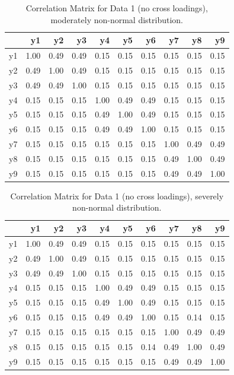 \documentclass[
  letterpaper,
  DIV=11,
  numbers=noendperiod]{scrartcl}
\begin{document}
\begin{longtable}[]{@{}lrrrrrrrrr@{}}

\caption{\label{tbl-cors_data_2}Correlation Matrix for Data 1 (no cross
loadings), moderately non-normal distribution.}

\tabularnewline

\toprule\noalign{}
& y1 & y2 & y3 & y4 & y5 & y6 & y7 & y8 & y9 \\
\midrule\noalign{}
\endhead
\bottomrule\noalign{}
\endlastfoot
y1 & 1.00 & 0.49 & 0.49 & 0.15 & 0.15 & 0.15 & 0.15 & 0.15 & 0.15 \\
y2 & 0.49 & 1.00 & 0.49 & 0.15 & 0.15 & 0.15 & 0.15 & 0.15 & 0.15 \\
y3 & 0.49 & 0.49 & 1.00 & 0.15 & 0.15 & 0.15 & 0.15 & 0.15 & 0.15 \\
y4 & 0.15 & 0.15 & 0.15 & 1.00 & 0.49 & 0.49 & 0.15 & 0.15 & 0.15 \\
y5 & 0.15 & 0.15 & 0.15 & 0.49 & 1.00 & 0.49 & 0.15 & 0.15 & 0.15 \\
y6 & 0.15 & 0.15 & 0.15 & 0.49 & 0.49 & 1.00 & 0.15 & 0.15 & 0.15 \\
y7 & 0.15 & 0.15 & 0.15 & 0.15 & 0.15 & 0.15 & 1.00 & 0.49 & 0.49 \\
y8 & 0.15 & 0.15 & 0.15 & 0.15 & 0.15 & 0.15 & 0.49 & 1.00 & 0.49 \\
y9 & 0.15 & 0.15 & 0.15 & 0.15 & 0.15 & 0.15 & 0.49 & 0.49 & 1.00 \\

\end{longtable}

\begin{longtable}[]{@{}lrrrrrrrrr@{}}

\caption{\label{tbl-cors_data_3}Correlation Matrix for Data 1 (no cross
loadings), severely non-normal distribution.}

\tabularnewline

\toprule\noalign{}
& y1 & y2 & y3 & y4 & y5 & y6 & y7 & y8 & y9 \\
\midrule\noalign{}
\endhead
\bottomrule\noalign{}
\endlastfoot
y1 & 1.00 & 0.49 & 0.49 & 0.15 & 0.15 & 0.15 & 0.15 & 0.15 & 0.15 \\
y2 & 0.49 & 1.00 & 0.49 & 0.15 & 0.15 & 0.15 & 0.15 & 0.15 & 0.15 \\
y3 & 0.49 & 0.49 & 1.00 & 0.15 & 0.15 & 0.15 & 0.15 & 0.15 & 0.15 \\
y4 & 0.15 & 0.15 & 0.15 & 1.00 & 0.49 & 0.49 & 0.15 & 0.15 & 0.15 \\
y5 & 0.15 & 0.15 & 0.15 & 0.49 & 1.00 & 0.49 & 0.15 & 0.15 & 0.15 \\
y6 & 0.15 & 0.15 & 0.15 & 0.49 & 0.49 & 1.00 & 0.15 & 0.14 & 0.15 \\
y7 & 0.15 & 0.15 & 0.15 & 0.15 & 0.15 & 0.15 & 1.00 & 0.49 & 0.49 \\
y8 & 0.15 & 0.15 & 0.15 & 0.15 & 0.15 & 0.14 & 0.49 & 1.00 & 0.49 \\
y9 & 0.15 & 0.15 & 0.15 & 0.15 & 0.15 & 0.15 & 0.49 & 0.49 & 1.00 \\

\end{longtable}
\end{document}
